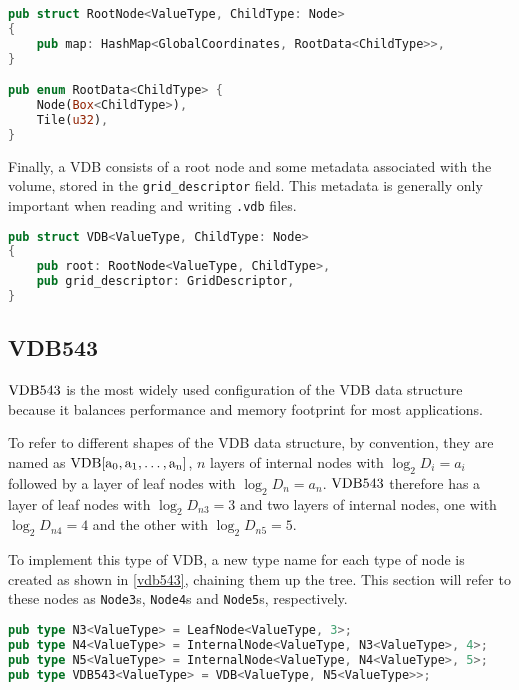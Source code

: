 \newpage
\begin{lstlisting}[language=rust, captionpos=b, caption={
    \texttt{RootNode} definition. \texttt{RootData} is either a pointer to a child or 4 bytes of data for a tile value.
  },label={code:root}]
pub struct RootNode<ValueType, ChildType: Node>
{
    pub map: HashMap<GlobalCoordinates, RootData<ChildType>>,
}

pub enum RootData<ChildType> {
    Node(Box<ChildType>),
    Tile(u32),
}
\end{lstlisting}

Finally, a VDB consists of a root node and some metadata associated with the volume, stored in the \verb|grid_descriptor| field. This metadata is generally only important when reading and writing \verb|.vdb| files.

\begin{lstlisting}[language=rust, captionpos=b, caption={\texttt{VDB} definition}, label={vdb:def}]
pub struct VDB<ValueType, ChildType: Node>
{
    pub root: RootNode<ValueType, ChildType>,
    pub grid_descriptor: GridDescriptor,
}
\end{lstlisting}

\subsection{VDB543}
$\rm{VDB}543$ is the most widely used configuration of the VDB data structure because it balances performance and memory footprint for most applications.
\begin{sloppypar}
  To refer to different shapes of the VDB data structure, by convention, they are named as ${\rm{VDB}[a_{0},a_{1},\dots, a_{n}]}$, $n$ layers of internal nodes with $\log_{2}D_{i}=a_{i}$ followed by a layer of leaf nodes with $\log_{2}D_{n}=a_{n}$. $\rm{VDB}543$ therefore has a layer of leaf nodes with $\log_{2}D_{n3} = 3$ and two layers of internal nodes, one with $\log_{2}D_{n4} = 4$ and the other with $\log_{2}D_{n5} = 5$.
\end{sloppypar}

To implement this type of VDB, a new type name for each type of node is created as shown in \cref{vdb543}, chaining them up the tree. This section will refer to these nodes as \texttt{Node3}s, \texttt{Node4}s and \texttt{Node5}s, respectively.

\begin{lstlisting}[language=rust, captionpos=b, caption={\texttt{VDB543} definition}, label={vdb543}]
pub type N3<ValueType> = LeafNode<ValueType, 3>;
pub type N4<ValueType> = InternalNode<ValueType, N3<ValueType>, 4>;
pub type N5<ValueType> = InternalNode<ValueType, N4<ValueType>, 5>;
pub type VDB543<ValueType> = VDB<ValueType, N5<ValueType>>;
\end{lstlisting}

